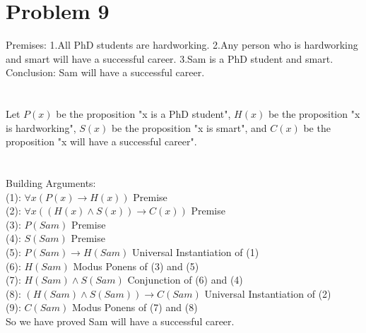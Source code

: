 \documentclass{article}
\begin{document}
\section{Problem 9}
Premises: 1.All PhD students are hardworking. 2.Any person who is hardworking and smart will have a successful career. 3.Sam is a PhD student and smart.\\
Conclusion: Sam will have a successful career.\\
\\ \hspace*{\fill} \\
Let $P(x)$ be the proposition "x is a PhD student", $H(x)$ be the proposition "x is hardworking", $S(x)$ be the proposition "x is smart", and $C(x)$ be the proposition "x will have a successful career".\\
\\ \hspace*{\fill} \\
Building Arguments:\\
(1): $\forall x (P(x) \rightarrow H(x))$ Premise\\
(2): $\forall x ((H(x) \wedge S(x)) \rightarrow C(x))$ Premise\\
(3): $P(Sam)$ Premise\\
(4): $S(Sam)$ Premise\\
(5): $P(Sam) \rightarrow H(Sam)$ Universal Instantiation of (1)\\
(6): $H(Sam)$ Modus Ponens of (3) and (5)\\
(7): $H(Sam) \wedge S(Sam)$ Conjunction of (6) and (4)\\
(8): $(H(Sam) \wedge S(Sam)) \rightarrow C(Sam)$ Universal Instantiation of (2)\\
(9): $C(Sam)$ Modus Ponens of (7) and (8)\\
So we have proved Sam will have a successful career.\\
\\ \hspace*{\fill} \\
\end{document}
